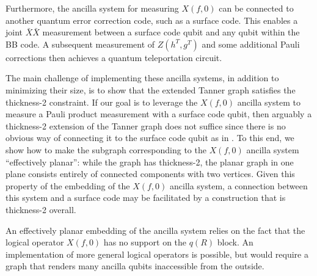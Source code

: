 \documentclass{article}
\begin{document}
Furthermore, the ancilla system for measuring $X(f,0)$ can be connected to another quantum error correction code, such as a surface code. This enables a joint $\bar X \bar X$ measurement between a surface code qubit and any qubit within the BB code. A subsequent measurement of $Z(h^T,g^T)$ and some additional Pauli corrections then achieves a quantum teleportation circuit.

The main challenge of implementing these ancilla systems, in addition to minimizing their size, is to show that the extended Tanner graph satisfies the thickness-2 constraint. If our goal is to leverage the $X(f,0)$ ancilla system to measure a Pauli product measurement with a surface code qubit, then arguably a thickness-2 extension of the Tanner graph does not suffice since there is no obvious way of connecting it to the surface code qubit as in . To this end, we show how to make the subgraph corresponding to the $X(f,0)$ ancilla system ``effectively planar'': while the graph has thickness-2, the planar graph in one plane consists entirely of connected components with two vertices. Given this property of the embedding of the $X(f,0)$ ancilla system, a connection between this system and a surface code may be facilitated by a construction that is thickness-2 overall.

An effectively planar embedding of the ancilla system relies on the fact that the logical operator $X(f,0)$ has no support on the $q(R)$ block. An implementation of more general logical operators is possible, but would require a graph that renders many ancilla qubits inaccessible from the outside. 
\end{document}
